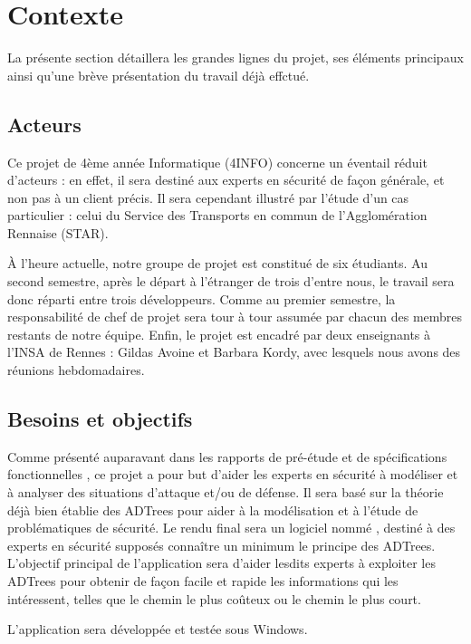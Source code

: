 \section{Contexte}
    \label{sec:contexte}
    La présente section détaillera les grandes lignes du projet, ses éléments principaux ainsi qu'une brève présentation du travail déjà effctué.

    \subsection{Acteurs}
        Ce projet de 4ème année Informatique (4INFO) concerne un éventail réduit d'acteurs : en effet, il sera destiné aux experts en sécurité de façon générale, et non pas à un client précis. Il sera cependant illustré par l'étude d'un cas particulier : celui du Service des Transports en commun de l'Agglomération Rennaise (STAR).

        À l'heure actuelle, notre groupe de projet est constitué de six étudiants. Au second semestre, après le départ à l’étranger de trois d'entre nous, le travail sera donc réparti entre trois développeurs. Comme au premier semestre, la responsabilité de chef de projet sera tour à tour assumée par chacun des membres restants de notre équipe. Enfin, le projet est encadré par deux enseignants à l'INSA de Rennes : Gildas {\sc Avoine} et Barbara {\sc Kordy}, avec lesquels nous avons des réunions hebdomadaires.

    \subsection{Besoins et objectifs}
        Comme présenté auparavant dans les rapports de pré-étude %
        et de spécifications fonctionnelles %
        , ce projet a pour but d'aider les experts en sécurité à modéliser et à analyser des situations d'attaque et/ou de défense. Il sera basé sur la théorie déjà bien établie des ADTrees pour aider à la modélisation et à l'étude de problématiques de sécurité. Le rendu final sera un logiciel nommé \glasir{}, destiné à des experts en sécurité supposés connaître un minimum le principe des ADTrees. L'objectif principal de l'application sera d'aider lesdits experts à exploiter les ADTrees pour obtenir de façon facile et rapide les informations qui les intéressent, telles que le chemin le plus coûteux ou le chemin le plus court.

        L'application sera développée et testée sous Windows.

